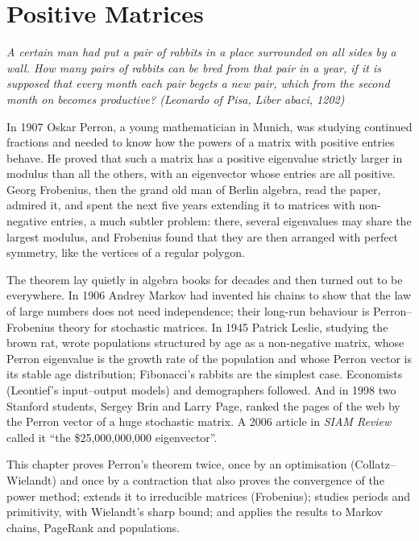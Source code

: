 \chapter{Positive Matrices}\label{ch:perron}

\begin{center}\itshape
A certain man had put a pair of rabbits in a place surrounded on all sides by a wall. How many pairs of rabbits can be
bred from that pair in a year, if it is supposed that every month each pair begets a new pair, which from the second
month on becomes productive?
\upshape(Leonardo of Pisa, \emph{Liber abaci}, 1202)
\end{center}

In 1907 Oskar Perron, a young mathematician in Munich, was studying continued fractions and needed to know how the
powers of a matrix with positive entries behave. He proved that such a matrix has a positive eigenvalue strictly larger
in modulus than all the others, with an eigenvector whose entries are all positive. Georg Frobenius, then the grand old
man of Berlin algebra, read the paper, admired it, and spent the next five years extending it to matrices with
non-negative entries, a much subtler problem: there, several eigenvalues may share the largest modulus, and Frobenius
found that they are then arranged with perfect symmetry, like the vertices of a regular polygon.

The theorem lay quietly in algebra books for decades and then turned out to be everywhere. In 1906 Andrey Markov had
invented his chains to show that the law of large numbers does not need independence; their long-run behaviour is
Perron--Frobenius theory for stochastic matrices. In 1945 Patrick Leslie, studying the brown rat, wrote populations
structured by age as a non-negative matrix, whose Perron eigenvalue is the growth rate of the population and whose Perron
vector is its stable age distribution; Fibonacci's rabbits are the simplest case. Economists (Leontief's input--output
models) and demographers followed. And in 1998 two Stanford students, Sergey Brin and Larry Page, ranked the pages of the
web by the Perron vector of a huge stochastic matrix. A 2006 article in \emph{SIAM Review} called it ``the
\$25{,}000{,}000{,}000 eigenvector''.

This chapter proves Perron's theorem twice, once by an optimisation (Collatz--Wielandt) and once by a contraction that also
proves the convergence of the power method; extends it to irreducible matrices (Frobenius); studies periods and
primitivity, with Wielandt's sharp bound; and applies the results to Markov chains, PageRank and populations.

